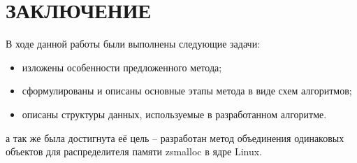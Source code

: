 \section*{ЗАКЛЮЧЕНИЕ}

В ходе данной работы были выполнены следующие задачи:

\begin{itemize}
	\item изложены особенности предложенного метода;
	\item сформулированы и описаны основные этапы метода в виде схем алгоритмов;
	\item описаны структуры данных, используемые в разработанном алгоритме.
\end{itemize}

а так же была достигнута её цель -- разработан метод объединения одинаковых объектов для распределителя памяти zsmalloc в ядре Linux.

\pagebreak